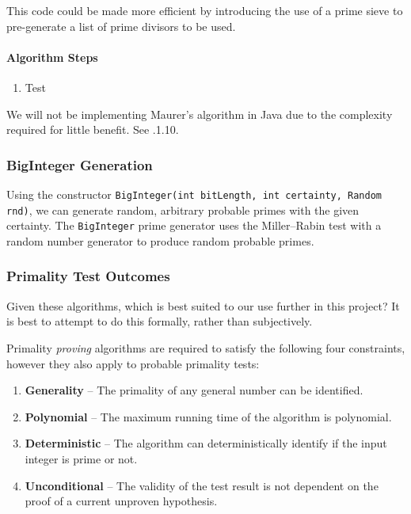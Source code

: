       
      
      This code could be made more efficient by introducing the use of a prime sieve to pre-generate a list of prime divisors to be used.
      
      \paragraph{Algorithm Steps}
      
      \begin{enumerate}
        \item Test
      \end{enumerate}
      
      We will not be implementing Maurer's algorithm in Java due to the complexity required for little benefit. See .1.10.
    
    \subsubsection{BigInteger Generation}
    
    Using the constructor \verb!BigInteger(int bitLength, int certainty, Random rnd)!, we can generate random, arbitrary probable primes with the given certainty. The \verb!BigInteger! prime generator uses the Miller--Rabin test\cite{Java:2006ab} with a random number generator to produce random probable primes.
    
    \subsubsection{Primality Test Outcomes}
    
    Given these algorithms, which is best suited to our use further in this project? It is best to attempt to do this formally, rather than subjectively.
    
    Primality \emph{proving} algorithms are required to satisfy the following four constraints, however they also apply to probable primality tests:
    
    \begin{enumerate}
      \item \textbf{Generality} -- The primality of any general number can be identified.
      \item \textbf{Polynomial} -- The maximum running time of the algorithm is polynomial.
      \item \textbf{Deterministic} -- The algorithm can deterministically identify if the input integer is prime or not.
      \item \textbf{Unconditional} -- The validity of the test result is not dependent on the proof of a current unproven hypothesis.
    \end{enumerate}
    
